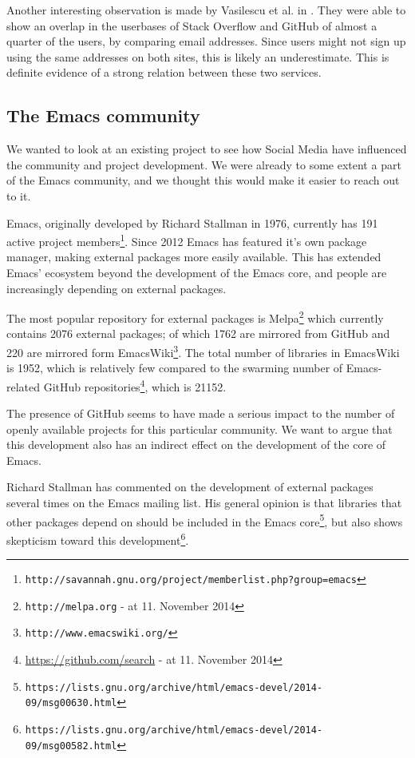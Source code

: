 \documentclass[a4paper,11pt]{article} %
\begin{document}
Another interesting observation is made by Vasilescu et al. in
\cite{Vasilescu2013Overlap}. They were able to show an overlap in the
userbases of Stack Overflow and GitHub of almost a quarter of the
users, by comparing email addresses. Since users might not sign up
using the same addresses on both sites, this is likely an
underestimate. This is definite evidence of a strong relation between
these two services.

\subsection{The Emacs community}

We wanted to look at an existing project to see how Social Media have
influenced the community and project development. We were already to
some extent a part of the Emacs community, and we thought this would
make it easier to reach out to it.

Emacs, originally developed by Richard Stallman in 1976, currently has
\num{191} active project
members\footnote{\texttt{http://savannah.gnu.org/project/memberlist.php?group=emacs}}.
Since \num{2012} Emacs has featured it's own package manager, making
external packages more easily available. This has extended Emacs' ecosystem
beyond the development of the Emacs core, and people are increasingly
depending on external packages.

The most popular repository for external packages is
Melpa\footnote{\texttt{http://melpa.org} - at 11. November 2014} which
currently contains \num{2076} external packages; of which \num{1762}
are mirrored from GitHub and \num{220} are mirrored form
EmacsWiki\footnote{\texttt{http://www.emacswiki.org/}}. The total
number of libraries in EmacsWiki is \num{1952}, which is relatively
few compared to the swarming number of Emacs-related GitHub
repositories\footnote{\href{https://github.com/search?utf8=\%E2\%9C\%93\&q=language\%3Aemacs-lisp\&type=Repositories\&ref=searchresults}{https://github.com/search}
  - at 11. November 2014}, which is \num{21152}.

The presence of GitHub seems to have made a serious impact to the number of
openly available projects for this particular community. We want to argue
that this development also has an indirect effect on the development of the
core of Emacs.

Richard Stallman has commented on the development of external packages
several times on the Emacs mailing list. His general opinion is that
libraries that other packages depend on should be included in the
Emacs
core\footnote{\texttt{https://lists.gnu.org/archive/html/emacs-devel/2014-09/msg00630.html}},
but also shows skepticism toward this
development\footnote{\texttt{https://lists.gnu.org/archive/html/emacs-devel/2014-09/msg00582.html}}.
\end{document}

